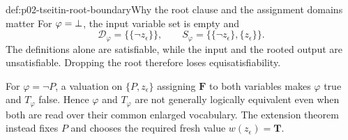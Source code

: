 \begin{hbexample}{def:p02-tseitin-root-boundary}{Why the root clause and the assignment domains matter}
For \(\varphi=\bot\), the input variable set is empty and
\[
 \mathcal D_\varphi=\bigl\{\{\neg z_\epsilon\}\bigr\},\qquad
 S_\varphi=\bigl\{\{\neg z_\epsilon\},\{z_\epsilon\}\bigr\}.
\]
The definitions alone are satisfiable, while the input and the rooted output
are unsatisfiable.  Dropping the root therefore loses equisatisfiability.

For \(\varphi=\neg P\), a valuation on \(\{P,z_\epsilon\}\) assigning
\(\mathbf{F}\) to both variables makes \(\varphi\) true and \(T_\varphi\)
false.  Hence \(\varphi\) and \(T_\varphi\) are not generally logically
equivalent even when both are read over their common enlarged vocabulary.
The extension theorem instead fixes \(P\) and chooses the required fresh
value \(w(z_\epsilon)=\mathbf{T}\).
\end{hbexample}
